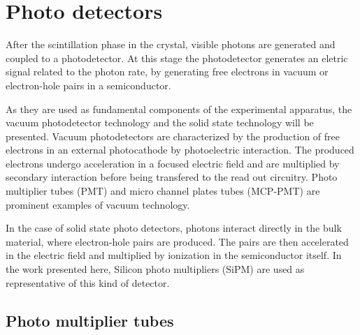 
\chapter{Photo detectors}
After the scintillation phase in the crystal, visible photons are generated and coupled to a photodetector. At this stage the photodetector generates an eletric signal related to the photon rate, by generating free electrons in vacuum or electron-hole pairs in a semiconductor.

As they are used as fundamental components of the experimental apparatus, the vacuum photodetector technology and the solid state technology will be presented.
Vacuum photodetectors are characterized by the production of free electrons in an external photocathode by photoelectric interaction. The produced electrons undergo acceleration in a focused electric field and are multiplied by secondary interaction before being transfered to the read out circuitry. Photo multiplier tubes (PMT) and micro channel plates tubes  (MCP-PMT) are prominent examples of vacuum technology.
  
In the case of solid state photo detectors, photons interact directly in the bulk material, where electron-hole pairs are produced. The pairs are then accelerated in the electric field and multiplied by ionization in the semiconductor itself. In the work presented here, Silicon photo multipliers (SiPM) are used as representative of this kind of detector.     

\section{Photo multiplier tubes}

